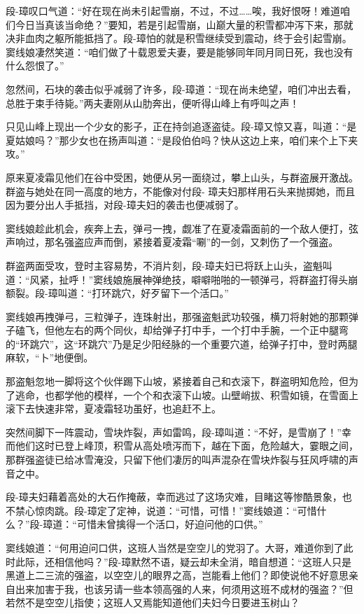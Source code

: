\documentclass[12pt,oneside]{book}
\begin{document}
段-璋叹口气道：``好在现在尚未引起雪崩，不过，不过\ldots\ldots 唉，我好恨呀！难道咱们今日当真该当命绝？''要知，若是引起雪崩，山巅大量的积雪都冲泻下来，那就决非血肉之躯所能抵挡了。段-璋怕的就是积雪继续受到震动，终于会引起雪崩。窦线娘凄然笑道：``咱们做了十载恩爱夫妻，要是能够同年同月同日死，我也没有什么怨恨了。''

忽然间，石块的袭击似乎减弱了许多，段-璋道：``现在尚未绝望，咱们冲出去看，总胜于束手待毙。''两夫妻刚从山肋奔出，便听得山峰上有呼叫之声！

只见山峰上现出一个少女的影子，正在持剑追逐盗徒。段-璋又惊又喜，叫道：``是夏姑娘吗？''那少女也在扬声叫道：``是段伯伯吗？快从这边上来，咱们来个上下夹攻。''

原来夏凌霜见他们在谷中受困，她便从另一面绕过，攀上山头，与群盗展开激战。群盗与她处在同一高度的地方，不能像对付段-
璋夫妇那样用石头来抛掷她，而且因为要分出人手抵挡，对段-璋夫妇的袭击也便减弱了。

窦线娘趁此机会，疾奔上去，弹弓一拽，觑准了在夏凌霜面前的一个敌人便打，弦声响过，那名强盗应声而倒，紧接着夏凌霜``唰''的一剑，又刺伤了一个强盗。

群盗两面受攻，登时主容易势，不消片刻，段-璋夫妇已将跃上山头，盗魁叫道：``风紧，扯呼！''窦线娘施展神弹绝技，噼噼啪啪的一顿弹弓，将群盗打得头崩额裂。段-璋叫道：``打环跳穴，好歹留下一个活口。''

窦线娘再拽弹弓，三粒弹子，连珠射出，那强盗魁武功较强，横刀将射她的那颗弹子磕飞，但他左右的两个同伙，却给弹子打中手，一个打中手腕，一个正中腿弯的``环跳穴''，这``环跳穴''乃是足少阳经脉的一个重要穴道，给弹子打中，登时两腿麻软，``卜''地便倒。

那盗魁忽地一脚将这个伙伴踢下山坡，紧接着自己和衣滚下，群盗明知危险，但为了逃命，也都学他的模样，一个个和衣滚下山坡。山壁峭拔、积雪如镜，在雪面上滚下去快速非常，夏凌霜轻功虽好，也追赶不上。

突然间脚下一阵震动，雪块炸裂，声如雷鸣，段-璋叫道：``不好，是雪崩了！''幸而他们这时已登上峰顶，积雪从高处喷泻而下，越在下面，危险越大，霎眼之间，那群强盗徒已给冰雪淹没，只留下他们凄厉的叫声混杂在雪块炸裂与狂风呼啸的声音之中。

段-璋夫妇藉着高处的大石作掩蔽，幸而逃过了这场灾难，目睹这等惨酷景象，也不禁心惊肉跳。段-璋定了定神，说道：``可惜，可惜！''窦线娘道：``可惜什么？''段-璋道：``可惜未曾擒得一个活口，好迫问他的口供。''

窦线娘道：``何用迫问口供，这班人当然是空空儿的党羽了。大哥，难道你到了此时此际，还相信他吗？''段-璋默然不语，疑云却未全消，暗自想道：``这班人只是黑道上二三流的强盗，以空空儿的眼界之高，岂能看上他们？即使说他不好意思亲自出来加害于我，也该另请一些本领高强的人来，何须用这班不成材的强盗？''但若然不是空空儿指使；这班人又焉能知道他们夫妇今日要进玉树山？
\end{document}
